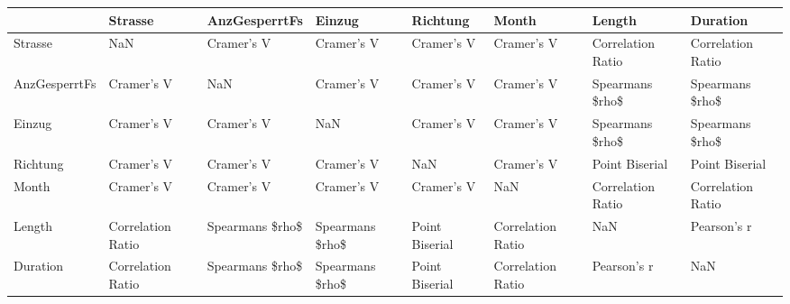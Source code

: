 \begin{tabular}{llllllll}
\toprule
{} &            Strasse &    AnzGesperrtFs &           Einzug &        Richtung &              Month &             Length &           Duration \\
\midrule
Strasse       &                NaN &       Cramer's V &       Cramer's V &      Cramer's V &         Cramer's V &  Correlation Ratio &  Correlation Ratio \\
AnzGesperrtFs &         Cramer's V &              NaN &       Cramer's V &      Cramer's V &         Cramer's V &    Spearmans \$rho\$ &    Spearmans \$rho\$ \\
Einzug        &         Cramer's V &       Cramer's V &              NaN &      Cramer's V &         Cramer's V &    Spearmans \$rho\$ &    Spearmans \$rho\$ \\
Richtung      &         Cramer's V &       Cramer's V &       Cramer's V &             NaN &         Cramer's V &     Point Biserial &     Point Biserial \\
Month         &         Cramer's V &       Cramer's V &       Cramer's V &      Cramer's V &                NaN &  Correlation Ratio &  Correlation Ratio \\
Length        &  Correlation Ratio &  Spearmans \$rho\$ &  Spearmans \$rho\$ &  Point Biserial &  Correlation Ratio &                NaN &        Pearson's r \\
Duration      &  Correlation Ratio &  Spearmans \$rho\$ &  Spearmans \$rho\$ &  Point Biserial &  Correlation Ratio &        Pearson's r &                NaN \\
\bottomrule
\end{tabular}
